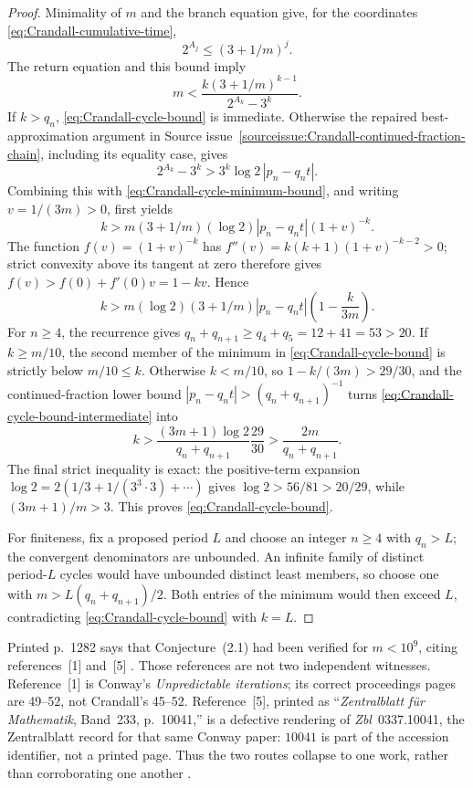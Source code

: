 \begin{proof}
Minimality of $m$ and the branch equation give, for the coordinates
\eqref{eq:Crandall-cumulative-time},
\begin{equation}
\label{eq:Crandall-cycle-growth-bound}
 2^{A_j}\leq(3+1/m)^j.
\end{equation}
The return equation and this bound imply
\begin{equation}
\label{eq:Crandall-cycle-minimum-bound}
 m<\frac{k(3+1/m)^{k-1}}{2^{A_k}-3^k}.
\end{equation}
If $k>q_n$, \eqref{eq:Crandall-cycle-bound} is immediate.  Otherwise the
repaired best-approximation argument in
Source issue~\ref{sourceissue:Crandall-continued-fraction-chain}, including
its equality case, gives
\[
 2^{A_k}-3^k>3^k\log2\,|p_n-q_nt|.
\]
Combining this with \eqref{eq:Crandall-cycle-minimum-bound}, and writing
$v=1/(3m)>0$, first yields
\[
 k>m(3+1/m)(\log2)|p_n-q_nt|(1+v)^{-k}.
\]
The function $f(v)=(1+v)^{-k}$ has
$f''(v)=k(k+1)(1+v)^{-k-2}>0$; strict convexity above its tangent at zero
therefore gives $f(v)>f(0)+f'(0)v=1-kv$.  Hence
\begin{equation}
\label{eq:Crandall-cycle-bound-intermediate}
 k>m(\log2)(3+1/m)|p_n-q_nt|\left(1-\frac{k}{3m}\right).
\end{equation}
For $n\geq4$, the recurrence gives
$q_n+q_{n+1}\geq q_4+q_5=12+41=53>20$.  If $k\geq m/10$, the second member
of the minimum in \eqref{eq:Crandall-cycle-bound} is strictly below
$m/10\leq k$.  Otherwise $k<m/10$, so
$1-k/(3m)>29/30$, and the continued-fraction lower bound
$|p_n-q_nt|>(q_n+q_{n+1})^{-1}$ turns
\eqref{eq:Crandall-cycle-bound-intermediate} into
\[
 k>\frac{(3m+1)\log2}{q_n+q_{n+1}}\frac{29}{30}
   >\frac{2m}{q_n+q_{n+1}}.
\]
The final strict inequality is exact: the positive-term expansion
$\log2=2(1/3+1/(3^3\cdot3)+\cdots)$ gives
$\log2>56/81>20/29$, while $(3m+1)/m>3$.
This proves \eqref{eq:Crandall-cycle-bound}.

For finiteness, fix a proposed period $L$ and choose an integer $n\geq4$ with
$q_n>L$; the convergent denominators are unbounded.  An infinite family of
distinct period-$L$ cycles would have unbounded distinct
least members, so choose one with
$m>L(q_n+q_{n+1})/2$.  Both entries of the minimum would then exceed $L$,
contradicting \eqref{eq:Crandall-cycle-bound} with $k=L$.
\end{proof}

\label{historical-10^9-premise}
Printed p.~1282 says that Conjecture~(2.1) had been verified for
$m<10^9$, citing references~[1] and~[5] \cite[p.~1282]{Crandall1978}.
Those references are not two independent witnesses.  Reference~[1] is
Conway's \emph{Unpredictable iterations}; its correct proceedings pages are
49--52, not Crandall's 45--52.  Reference~[5], printed as
``\emph{Zentralblatt f\"ur Mathematik}, Band~233, p.~10041,'' is a defective
rendering of \emph{Zbl}~0337.10041, the Zentralblatt record for that same
Conway paper: $10041$ is part of the accession identifier, not a printed
page.  Thus the two routes collapse to one work, rather than corroborating
one another \cite[p.~1292]{Crandall1978}.

